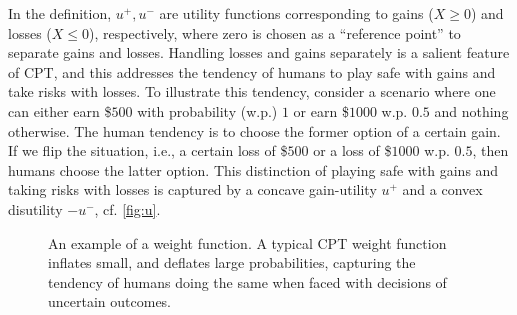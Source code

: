 In the definition, $u^+, u^-$ are utility functions corresponding to gains ($X \ge 0$) and losses ($X \le 0$), respectively,
where zero is chosen as a ``reference point'' to separate gains and losses.
Handling losses and gains separately is a salient feature of CPT, and this addresses the tendency of humans to play safe with gains and take risks with losses. %
To illustrate this tendency, 
consider a scenario where one can either earn \$$500$ with probability (w.p.) $1$ or earn \$$1000$ w.p. $0.5$ and nothing otherwise. 
The human tendency is to choose the former option of a certain gain. 
If we flip the situation, i.e., a certain loss of \$$500$ or a loss of \$$1000$ w.p. $0.5$, 
then humans choose the latter option.  
This distinction of playing safe with gains and taking risks with losses is captured by a concave gain-utility
$u^+$ and a convex disutility $-u^-$, cf. \cref{fig:u}.

\begin{figure}[h]
\centering
{}
\caption{An example of a weight function.
A typical CPT weight function inflates small, and deflates large probabilities, capturing the 
tendency of humans doing the same when faced with decisions of uncertain outcomes.
}
\label{fig:w}
\end{figure}

